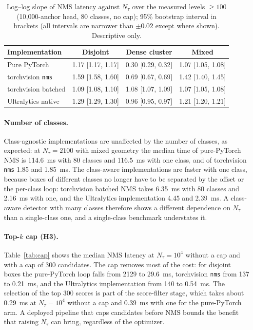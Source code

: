 \documentclass[a4paper,fleqn]{cas-dc}
\newcommand{\Ntau}{N_{\tau}}
\begin{document}
\begin{table}[t]
\centering\small
\caption{Log--log slope of NMS latency against $\Ntau$ over the measured levels $\ge 100$ (10{,}000-anchor head, 80 classes, no cap); 95\% bootstrap interval in brackets (all intervals are narrower than $\pm0.02$ except where shown). Descriptive only.}
\label{tab:slopes}
\begin{tabular}{@{}lccc@{}}
\toprule
Implementation & Disjoint & Dense cluster & Mixed \\
\midrule
Pure PyTorch & 1.17 [1.17, 1.17] & 0.30 [0.29, 0.32] & 1.07 [1.05, 1.08] \\
torchvision \texttt{nms} & 1.59 [1.58, 1.60] & 0.69 [0.67, 0.69] & 1.42 [1.40, 1.45] \\
torchvision batched & 1.09 [1.08, 1.10] & 1.08 [1.07, 1.09] & 1.07 [1.05, 1.08] \\
Ultralytics native & 1.29 [1.29, 1.30] & 0.96 [0.95, 0.97] & 1.21 [1.20, 1.21] \\
\bottomrule
\end{tabular}
\end{table}

\paragraph{Number of classes.}
Class-agnostic implementations are unaffected by the number of classes, as expected: at $\Ntau=2100$ with mixed geometry the median time of pure-PyTorch NMS is 114.6~ms with 80 classes and 116.5~ms with one class, and of torchvision \texttt{nms} 1.85 and 1.85~ms. The class-aware implementations are faster with one class, because boxes of different classes no longer have to be separated by the offset or the per-class loop: torchvision batched NMS takes 6.35~ms with 80 classes and 2.16~ms with one, and the Ultralytics implementation 4.45 and 2.39~ms. A class-aware detector with many classes therefore shows a different dependence on $\Ntau$ than a single-class one, and a single-class benchmark understates it.

\paragraph{Top-$k$ cap (H3).}
Table~\ref{tab:cap} shows the median NMS latency at $\Ntau=10^4$ without a cap and with a cap of 300 candidates. The cap removes most of the cost: for disjoint boxes the pure-PyTorch loop falls from 2129 to 29.6~ms, torchvision \texttt{nms} from 137 to 0.21~ms, and the Ultralytics implementation from 140 to 0.54~ms. The selection of the top 300 scores is part of the score-filter stage, which takes about 0.29~ms at $\Ntau=10^4$ without a cap and 0.39~ms with one for the pure-PyTorch arm. A deployed pipeline that caps candidates before NMS bounds the benefit that raising $\Ntau$ can bring, regardless of the optimizer.
\end{document}
